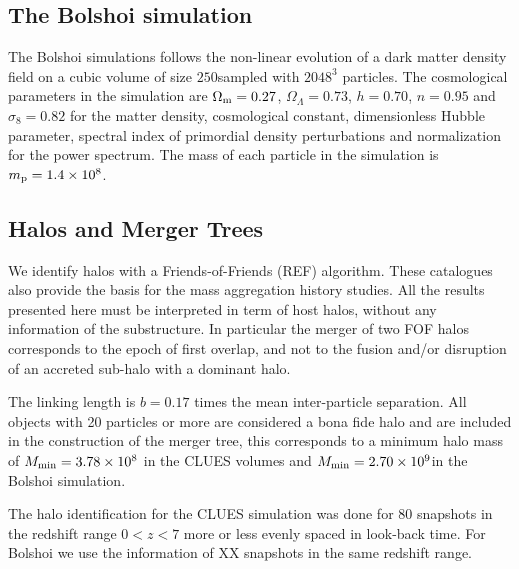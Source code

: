 \documentclass[usenatbib]{latex/mn2e}
\begin{document}
\subsection{The Bolshoi simulation}
\label{subsec:Bolshoi_simulation}


The Bolshoi simulations follows the non-linear evolution of a dark matter 
density field on a cubic volume of size $250$\hMpc sampled with $2048^3$ 
particles. The cosmological parameters in the simulation are 
$\Omega_{\rm m}=0.27$, $\Omega_{\Lambda}=0.73$, $h=0.70$, $n=0.95$ and 
$\sigma_{8}=0.82$ for the matter density, cosmological constant, 
dimensionless Hubble parameter, spectral index of primordial density 
perturbations and normalization for the power spectrum. The mass of each 
particle in the simulation is $m_{\rm p}=1.4\times 10^{8}$\hMsun.


\subsection{Halos and Merger Trees}
\label{subsec:halos_merger_trees}


We identify halos with a Friends-of-Friends (REF) algorithm. These 
catalogues also provide the basis for the mass aggregation history studies. 
All the results presented here must be interpreted in term of host halos, 
without any information of the substructure. In particular the merger of 
two FOF halos corresponds to the epoch of first overlap, and not to the 
fusion and/or disruption of an accreted sub-halo with a dominant halo. 


The linking length is $b=0.17$ times the mean inter-particle separation. 
All objects with 20 particles or more are considered a bona fide halo and 
are included in the construction of the merger tree, this corresponds to a 
minimum halo mass of $M_{\rm min}=3.78\times 10^{8}$ \hMsun in the CLUES 
volumes and $M_{\rm min}=2.70\times 10^{9}$\hMsun in the Bolshoi 
simulation.


The halo identification for the CLUES simulation was done for 80 snapshots 
in the redshift range $0<z<7$ more or less evenly spaced in look-back time. 
For Bolshoi we use the information of XX snapshots in the same redshift range.
\end{document}

